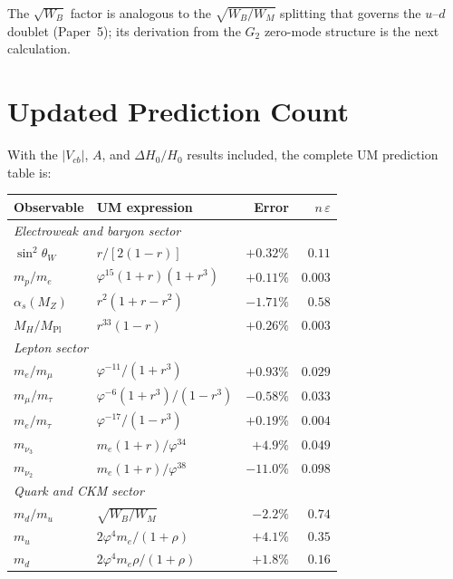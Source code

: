 \documentclass[12pt]{article}
\begin{document}
The $\sqrt{W_B}$ factor is analogous to the $\sqrt{W_B/W_M}$
splitting that governs the $u$--$d$ doublet (Paper~5); its derivation
from the $G_2$ zero-mode structure is the next calculation.

\section{Updated Prediction Count}

With the $|V_{cb}|$, $A$, and $\Delta H_0/H_0$ results included, the
complete UM prediction table is:

\begin{center}
\begin{tabular}{llrr}
\toprule
Observable & UM expression & Error & $n\,\varepsilon$ \\
\midrule
\multicolumn{4}{l}{\textit{Electroweak and baryon sector}} \\
$\sin^2\!\theta_W$      & $r/[2(1-r)]$                & $+0.32\%$ & $0.11$ \\
$m_p/m_e$               & $\varphi^{15}(1+r)(1+r^3)$  & $+0.11\%$ & $0.003$ \\
$\alpha_s(M_Z)$         & $r^2(1+r-r^2)$              & $-1.71\%$ & $0.58$ \\
$M_H/M_{\text{Pl}}$     & $r^{33}(1-r)$               & $+0.26\%$ & $0.003$ \\
\midrule
\multicolumn{4}{l}{\textit{Lepton sector}} \\
$m_e/m_\mu$             & $\varphi^{-11}/(1+r^3)$     & $+0.93\%$ & $0.029$ \\
$m_\mu/m_\tau$          & $\varphi^{-6}(1+r^3)/(1-r^3)$ & $-0.58\%$ & $0.033$ \\
$m_e/m_\tau$            & $\varphi^{-17}/(1-r^3)$     & $+0.19\%$ & $0.004$ \\
$m_{\nu_3}$             & $m_e(1+r)/\varphi^{34}$     & $+4.9\%$  & $0.049$ \\
$m_{\nu_2}$             & $m_e(1+r)/\varphi^{38}$     & $-11.0\%$ & $0.098$ \\
\midrule
\multicolumn{4}{l}{\textit{Quark and CKM sector}} \\
$m_d/m_u$               & $\sqrt{W_B/W_M}$            & $-2.2\%$  & $0.74$ \\
$m_u$                   & $2\varphi^4 m_e/(1{+}\rho)$ & $+4.1\%$  & $0.35$ \\
$m_d$                   & $2\varphi^4 m_e\rho/(1{+}\rho)$ & $+1.8\%$ & $0.16$ \\

\end{tabular}
\end{center}
\end{document}

